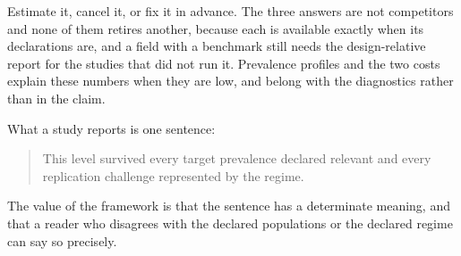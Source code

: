 \documentclass[11pt]{article}
\theoremstyle{remark}
\begin{document}
Estimate it, cancel it, or fix it in advance. The three answers are not competitors and none of them retires another, because each is available exactly when its declarations are, and a field with a benchmark still needs the design-relative report for the studies that did not run it. Prevalence profiles and the two costs explain these numbers when they are low, and belong with the diagnostics rather than in the claim.

What a study reports is one sentence:

\begin{quote}
This level survived every target prevalence declared relevant and every replication challenge represented by the regime.
\end{quote}

The value of the framework is that the sentence has a determinate meaning, and that a reader who disagrees with the declared populations or the declared regime can say so precisely.
\end{document}
